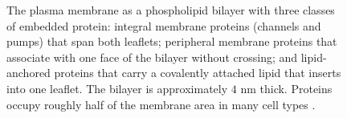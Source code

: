 \begin{figure}[htbp]
\begin{tikzpicture}
\end{tikzpicture}
\caption[The plasma membrane: bilayer with embedded proteins]{The
plasma membrane as a phospholipid bilayer with three classes of
embedded protein: integral membrane proteins (channels and pumps)
that span both leaflets; peripheral membrane proteins that associate
with one face of the bilayer without crossing; and lipid-anchored
proteins that carry a covalently attached lipid that inserts into one
leaflet. The bilayer is approximately $4$ nm thick. Proteins occupy
roughly half of the membrane area in many cell types
\cite[ch.~10]{text:v6c01-alberts-mbc-2022}.}
\label{fig:vol06:ch01:membrane-bilayer}
\end{figure}
